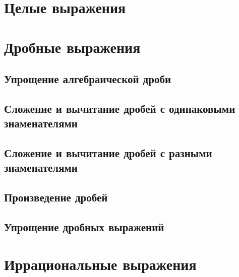 \documentclass[10pt, a4paper]{article}
\begin{document}
\section{Целые выражения}
\section{Дробные выражения}
	\subsection{Упрощение алгебраической дроби}
	\subsection{Сложение и вычитание дробей с одинаковыми знаменателями}
	\subsection{Сложение и вычитание дробей с разными знаменателями}
	\subsection{Произведение дробей}
	\subsection{Упрощение дробных выражений}
		
\section{Иррациональные выражения}
\end{document}
